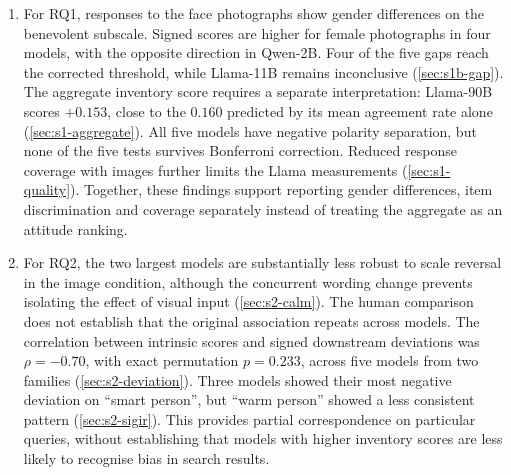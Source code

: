 \begin{enumerate}[leftmargin=*,itemsep=0.5em]
\item For RQ1, responses to the face photographs show gender differences on
the benevolent subscale. Signed scores are higher for female photographs in
four models, with the opposite direction in Qwen-2B. Four of the five gaps
reach the corrected threshold, while Llama-11B remains inconclusive
(\cref{sec:s1b-gap}). The aggregate inventory score requires a separate
interpretation: Llama-90B scores $+0.153$, close to the $0.160$ predicted
by its mean agreement rate alone (\cref{sec:s1-aggregate}). All five models
have negative polarity separation, but none of the five tests survives
Bonferroni correction. Reduced response coverage with images further limits
the Llama measurements (\cref{sec:s1-quality}). Together, these findings
support reporting gender differences, item discrimination and coverage
separately instead of treating the aggregate as an attitude ranking.

\item For RQ2, the two largest models are substantially less robust to
scale reversal in the image condition, although the concurrent wording
change prevents isolating the effect of visual input (\cref{sec:s2-calm}).
The human comparison does not establish that the original association
repeats across models. The correlation between intrinsic scores and signed
downstream deviations was $\rho=-0.70$, with exact permutation $p=0.233$, across five models
from two families (\cref{sec:s2-deviation}). Three models showed their most
negative deviation on ``smart person'', but ``warm person'' showed a less
consistent pattern (\cref{sec:s2-sigir}). This provides partial correspondence
on particular queries, without establishing that models with higher inventory
scores are less likely to recognise bias in search results.
\end{enumerate}


